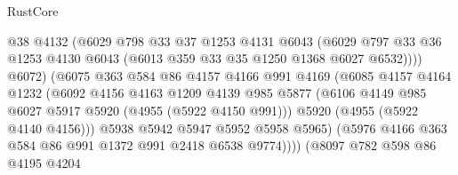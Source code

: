 \begin{lexlean}{RustCore}
\begin{coremodule}
                                    @38
                                    @4132
                                    (@6029
                                      @798
                                      @33
                                      @37
                                      @1253
                                      @4131
                                      @6043
                                      (@6029
                                        @797
                                        @33
                                        @36
                                        @1253
                                        @4130
                                        @6043
                                        (@6013 @359 @33 @35 @1250 @1368 @6027 @6532))))
                                  @6072)
                                (@6075
                                  @363
                                  @584
                                  @86
                                  @4157
                                  @4166
                                  @991
                                  @4169
                                  (@6085
                                    @4157
                                    @4164
                                    @1232
                                    (@6092
                                      @4156
                                      @4163
                                      @1209
                                      @4139
                                      @985
                                      @5877
                                      (@6106
                                        @4149
                                        @985
                                        @6027
                                        @5917
                                        @5920
                                        (@4955 (@5922 @4150 @991)))
                                      @5920
                                      (@4955 (@5922 @4140 @4156)))
                                    @5938
                                    @5942
                                    @5947
                                    @5952
                                    @5958
                                    @5965)
                                  (@5976 @4166 @363 @584 @86 @991 @1372 @991 @2418 @6538 @9774))))
                            (@8097
                              @782
                              @598
                              @86
                              @4195
                              @4204

\end{coremodule}
\end{lexlean}
